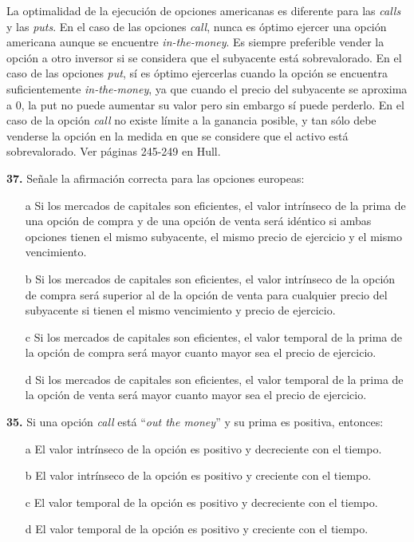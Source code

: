 \documentclass{nuevotema}
\begin{document}
La optimalidad de la ejecución de opciones americanas es diferente para las \textit{calls} y las \textit{puts}. En el caso de las opciones \textit{call}, nunca es óptimo ejercer una opción americana aunque se encuentre \textit{in-the-money}. Es siempre preferible vender la opción a otro inversor si se considera que el subyacente está sobrevalorado. En el caso de las opciones \textit{put}, sí es óptimo ejercerlas cuando la opción se encuentra suficientemente \textit{in-the-money}, ya que cuando el precio del subyacente se aproxima a 0, la put no puede aumentar su valor pero sin embargo sí puede perderlo. En el caso de la opción \textit{call} no existe límite a la ganancia posible, y tan sólo debe venderse la opción en la medida en que se considere que el activo está sobrevalorado. Ver páginas 245-249 en Hull.

\preguntas



\textbf{37.} Señale la afirmación correcta para las opciones europeas:

\begin{itemize}
	\item[a] Si los mercados de capitales son eficientes, el valor intrínseco de la prima de una opción de compra y de una opción de venta será idéntico si ambas opciones tienen el mismo subyacente, el mismo precio de ejercicio y el mismo vencimiento.
	\item[b] Si los mercados de capitales son eficientes, el valor intrínseco de la opción de compra será superior al de la opción de venta para cualquier precio del subyacente si tienen el mismo vencimiento y precio de ejercicio.
	\item[c] Si los mercados de capitales son eficientes, el valor temporal de la prima de la opción de compra será mayor cuanto mayor sea el precio de ejercicio.
	\item[d] Si los mercados de capitales son eficientes, el valor temporal de la prima de la opción de venta será mayor cuanto mayor sea el precio de ejercicio.
\end{itemize}

\textbf{35.} Si una opción \textit{call} está ``\textit{out the money}'' y su prima es positiva, entonces:

\begin{itemize}
	\item[a] El valor intrínseco de la opción es positivo y decreciente con el tiempo.
	\item[b] El valor intrínseco de la opción es positivo y creciente con el tiempo.
	\item[c] El valor temporal de la opción es positivo y decreciente con el tiempo.
	\item[d] El valor temporal de la opción es positivo y creciente con el tiempo.
\end{itemize}
\end{document}
